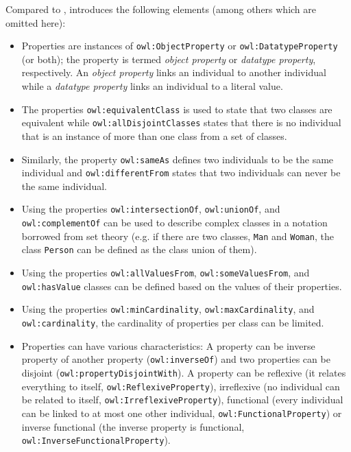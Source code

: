 Compared to ,  introduces the following elements (among others which are omitted here):

\begin{itemize}
  \item Properties are instances of \texttt{owl:ObjectProperty} or \texttt{owl:DatatypeProperty} (or both); the property is termed \emph{object property} or \emph{datatype property}, respectively. An \emph{object property} links an individual to another individual while a \emph{datatype property} links an individual to a literal value.
  \item The properties \texttt{owl:equivalentClass} is used to state that two classes are equivalent while \texttt{owl:allDisjointClasses} states that there is no individual that is an instance of more than one class from a set of classes.
  \item Similarly, the property \texttt{owl:sameAs} defines two individuals to be the same individual and \texttt{owl:differentFrom} states that two individuals can never be the same individual.
  \item Using the properties \texttt{owl:intersectionOf}, \texttt{owl:unionOf}, and \texttt{owl:\hspace{0pt}complement\hspace{0pt}Of} can be used to describe complex classes in a notation borrowed from set theory (e.g. if there are two classes, \texttt{Man} and \texttt{Woman}, the class \texttt{Person} can be defined as the class union of them).
  \item Using the properties \texttt{owl:allValuesFrom}, \texttt{owl:someValuesFrom}, and \texttt{owl:\hspace{0pt}has\hspace{0pt}Value} classes can be defined based on the values of their properties.
  \item Using the properties \texttt{owl:minCardinality}, \texttt{owl:maxCardinality}, and \texttt{owl:\hspace{0pt}cardinality}, the cardinality of properties per class can be limited.
  \item Properties can have various characteristics: A property can be inverse property of another property (\texttt{owl:inverseOf}) and two properties can be disjoint (\texttt{owl:property\hspace{0pt}Disjoint\hspace{0pt}With}). A property can be reflexive (it relates everything to itself, \texttt{owl:\hspace{0pt}Reflexive\hspace{0pt}Property}), irreflexive (no individual can be related to itself, \texttt{owl:\hspace{0pt}Irreflexive\hspace{0pt}Property}), functional (every individual can be linked to at most one other individual, \texttt{owl:\hspace{0pt}Functional\hspace{0pt}Property}) or inverse functional (the inverse property is functional, \texttt{owl:\hspace{0pt}Inverse\hspace{0pt}Functional\hspace{0pt}Property}).

\end{itemize}
